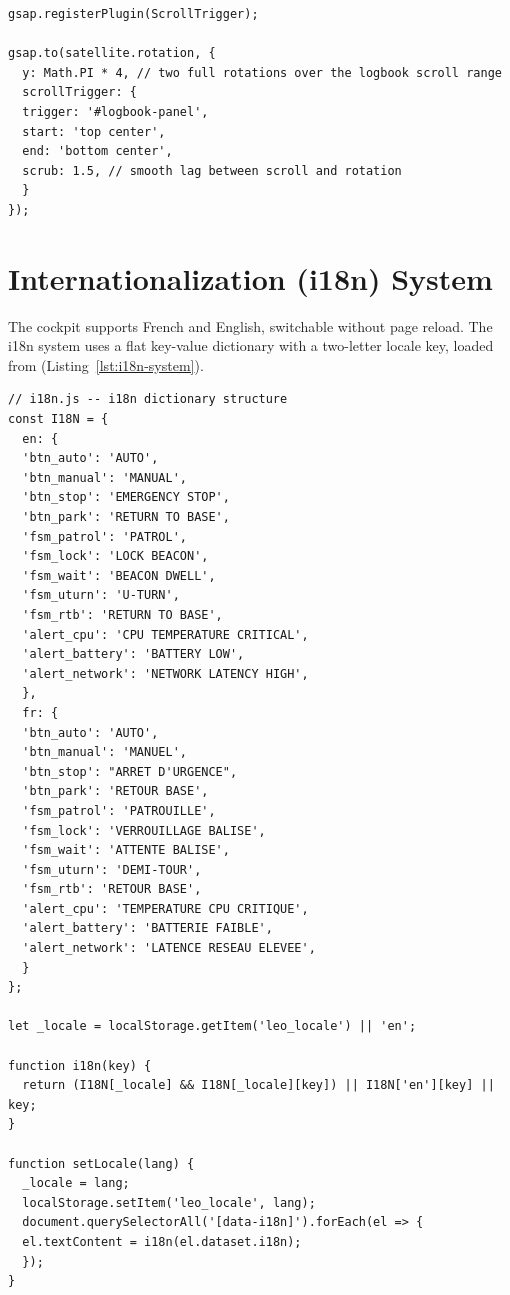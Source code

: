 \begin{lstlisting}[caption={GSAP ScrollTrigger-driven satellite rotation}, label={lst:gsap-scroll}]
gsap.registerPlugin(ScrollTrigger);

gsap.to(satellite.rotation, {
  y: Math.PI * 4, // two full rotations over the logbook scroll range
  scrollTrigger: {
  trigger: '#logbook-panel',
  start: 'top center',
  end: 'bottom center',
  scrub: 1.5, // smooth lag between scroll and rotation
  }
});
\end{lstlisting}

\section{Internationalization (i18n) System}

The cockpit supports French and English, switchable without page reload. The i18n system uses a flat key-value dictionary with a two-letter locale key, loaded from  (Listing~\ref{lst:i18n-system}).

\begin{lstlisting}[caption={Flat key-value i18n dictionary system}, label={lst:i18n-system}]
// i18n.js -- i18n dictionary structure
const I18N = {
  en: {
  'btn_auto': 'AUTO',
  'btn_manual': 'MANUAL',
  'btn_stop': 'EMERGENCY STOP',
  'btn_park': 'RETURN TO BASE',
  'fsm_patrol': 'PATROL',
  'fsm_lock': 'LOCK BEACON',
  'fsm_wait': 'BEACON DWELL',
  'fsm_uturn': 'U-TURN',
  'fsm_rtb': 'RETURN TO BASE',
  'alert_cpu': 'CPU TEMPERATURE CRITICAL',
  'alert_battery': 'BATTERY LOW',
  'alert_network': 'NETWORK LATENCY HIGH',
  },
  fr: {
  'btn_auto': 'AUTO',
  'btn_manual': 'MANUEL',
  'btn_stop': "ARRET D'URGENCE",
  'btn_park': 'RETOUR BASE',
  'fsm_patrol': 'PATROUILLE',
  'fsm_lock': 'VERROUILLAGE BALISE',
  'fsm_wait': 'ATTENTE BALISE',
  'fsm_uturn': 'DEMI-TOUR',
  'fsm_rtb': 'RETOUR BASE',
  'alert_cpu': 'TEMPERATURE CPU CRITIQUE',
  'alert_battery': 'BATTERIE FAIBLE',
  'alert_network': 'LATENCE RESEAU ELEVEE',
  }
};

let _locale = localStorage.getItem('leo_locale') || 'en';

function i18n(key) {
  return (I18N[_locale] && I18N[_locale][key]) || I18N['en'][key] || key;
}

function setLocale(lang) {
  _locale = lang;
  localStorage.setItem('leo_locale', lang);
  document.querySelectorAll('[data-i18n]').forEach(el => {
  el.textContent = i18n(el.dataset.i18n);
  });
}
\end{lstlisting}

